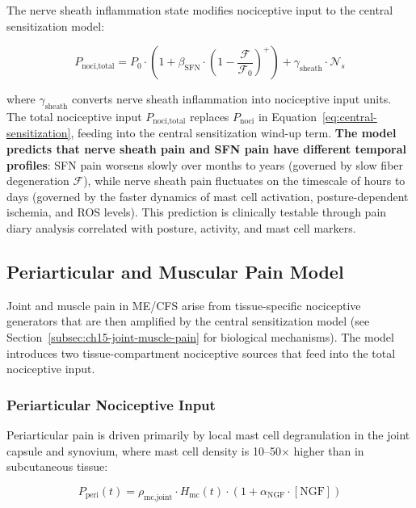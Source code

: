 The nerve sheath inflammation state modifies nociceptive input to the central sensitization model:

\begin{equation}
\label{eq:noci-nerve-sheath}
P_{\text{noci,total}} = P_0 \cdot \left(1 + \beta_{\text{SFN}} \cdot \left(1 - \frac{\mathcal{F}}{\mathcal{F}_0}\right)^+\right) + \gamma_{\text{sheath}} \cdot \mathcal{N}_s
\end{equation}

where $\gamma_{\text{sheath}}$ converts nerve sheath inflammation into nociceptive input units. The total nociceptive input $P_{\text{noci,total}}$ replaces $P_{\text{noci}}$ in Equation~\ref{eq:central-sensitization}, feeding into the central sensitization wind-up term. \textbf{The model predicts that nerve sheath pain and SFN pain have different temporal profiles}: SFN pain worsens slowly over months to years (governed by slow fiber degeneration $\mathcal{F}$), while nerve sheath pain fluctuates on the timescale of hours to days (governed by the faster dynamics of mast cell activation, posture-dependent ischemia, and ROS levels). This prediction is clinically testable through pain diary analysis correlated with posture, activity, and mast cell markers.

\subsection{Periarticular and Muscular Pain Model}
\label{subsec:periarticular-muscle-pain-model}

Joint and muscle pain in ME/CFS arise from tissue-specific nociceptive generators that are then amplified by the central sensitization model (see Section~\ref{subsec:ch15-joint-muscle-pain} for biological mechanisms). The model introduces two tissue-compartment nociceptive sources that feed into the total nociceptive input.

\subsubsection{Periarticular Nociceptive Input}

Periarticular pain is driven primarily by local mast cell degranulation in the joint capsule and synovium, where mast cell density is 10--50$\times$ higher than in subcutaneous tissue:

\begin{equation}
\label{eq:periarticular-noci}
P_{\text{peri}}(t) = \rho_{\text{mc,joint}} \cdot H_{\text{mc}}(t) \cdot (1 + \alpha_{\text{NGF}} \cdot [\text{NGF}])
\end{equation}


